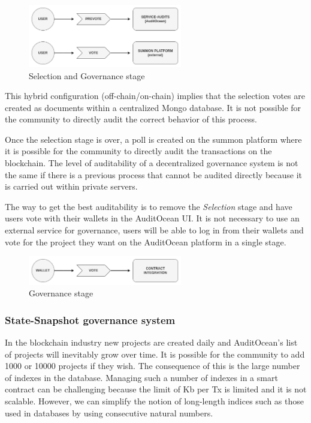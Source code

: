 \documentclass[9pt]{article}
\begin{document}
\begin{figure}[ht]
  \centering
  \includegraphics[width=0.6\textwidth]{votes.png}
  \caption{Selection and Governance stage
  }
  \label{fig:mi_imagen}
\end{figure}
This hybrid configuration (off-chain/on-chain) implies that the selection votes are created as documents within a centralized Mongo database. It is not possible for the community to directly audit the correct behavior of this process.

Once the selection stage is over, a poll is created on the summon platform where it is possible for the community to directly audit the transactions on the blockchain. The level of auditability of a decentralized governance system is not the same if there is a previous process that cannot be audited directly because it is carried out within private servers.

The way to get the best auditability is to remove the \emph{Selection} stage and have users vote with their wallets in the AuditOcean UI. It is not necessary to use an external service for governance, users will be able to log in from their wallets and vote for the project they want on the AuditOcean platform in a single stage.

\begin{figure}[ht]
  \centering
  \includegraphics[width=0.6\textwidth]{last.png}
  \caption{Governance stage
  }
  \label{fig:mi_imagen}
\end{figure}



\subsubsection { State-Snapshot governance system } 


In the blockchain industry new projects are created daily and AuditOcean's list of projects will inevitably grow over time. It is possible for the community to add 1000 or 10000 projects if they wish. The consequence of this is the large number of indexes in the database. Managing such a number of indexes in a smart contract can be challenging because the limit of Kb per Tx is limited and it is not scalable. However, we can simplify the notion of long-length indices such as those used in databases by using consecutive natural numbers.
\end{document}
